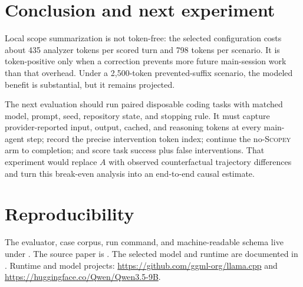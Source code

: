 \documentclass[10pt]{article}
\newcommand{\scopey}{\textsc{Scopey}\xspace}
\begin{document}
\section{Conclusion and next experiment}

Local scope summarization is not token-free: the selected configuration costs
about 435 analyzer tokens per scored turn and 798 tokens per scenario. It is
token-positive only when a correction prevents more future main-session work
than that overhead. Under a 2,500-token prevented-suffix scenario, the modeled
benefit is substantial, but it remains projected.

The next evaluation should run paired disposable coding tasks with matched
model, prompt, seed, repository state, and stopping rule. It must capture
provider-reported input, output, cached, and reasoning tokens at every main-agent
step; record the precise intervention token index; continue the no-\scopey arm
to completion; and score task success plus false interventions. That experiment
would replace $A$ with observed counterfactual trajectory differences and turn
this break-even analysis into an end-to-end causal estimate.

\section*{Reproducibility}

The evaluator, case corpus, run command, and machine-readable schema live under
. The source paper is
. The selected model and runtime
are documented in . Runtime and model
projects: \url{https://github.com/ggml-org/llama.cpp} and
\url{https://huggingface.co/Qwen/Qwen3.5-9B}.
\end{document}
